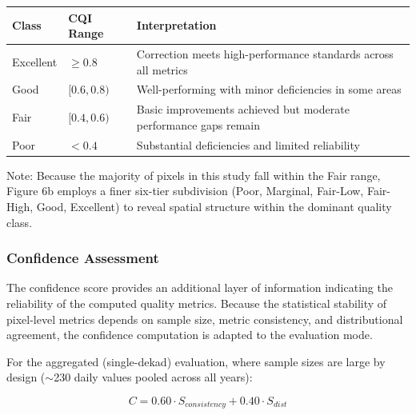 \documentclass[remotesensing,article,submit,pdftex,moreauthors]{Definitions/mdpi}
\begin{document}
\begin{longtable}[]{@{}
  >{\centering\arraybackslash}p{}
  >{\centering\arraybackslash}p{}
  >{\raggedright\arraybackslash}p{}@{}}
\toprule\noalign{}
\begin{minipage}[b]{\linewidth}\centering
Class
\end{minipage} & \begin{minipage}[b]{\linewidth}\centering
CQI Range
\end{minipage} & \begin{minipage}[b]{\linewidth}\raggedright
Interpretation
\end{minipage} \\
\midrule\noalign{}
\endhead
\bottomrule\noalign{}
\endlastfoot
Excellent & \(\geq 0.8\) & Correction meets high-performance standards
across all metrics \\
Good & \([0.6, 0.8)\) & Well-performing with minor deficiencies in some
areas \\
Fair & \([0.4, 0.6)\) & Basic improvements achieved but moderate
performance gaps remain \\
Poor & \(< 0.4\) & Substantial deficiencies and limited reliability \\
\end{longtable}

Note: Because the majority of pixels in this study fall within the Fair
range, Figure 6b employs a finer six-tier subdivision (Poor, Marginal,
Fair-Low, Fair-High, Good, Excellent) to reveal spatial structure within
the dominant quality class.

\subsubsection{Confidence Assessment}\label{confidence-assessment}

The confidence score provides an additional layer of information
indicating the reliability of the computed quality metrics. Because the
statistical stability of pixel-level metrics depends on sample size,
metric consistency, and distributional agreement, the confidence
computation is adapted to the evaluation mode.

For the aggregated (single-dekad) evaluation, where sample sizes are
large by design ($\sim$230 daily values pooled across all years):

\[C = 0.60 \cdot S_{consistency} + 0.40 \cdot S_{dist}\]
\end{document}

